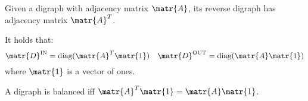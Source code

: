 \begin{description}
        \begin{remark}
            Given a digraph with adjacency matrix $\matr{A}$, its reverse digraph has adjacency matrix $\matr{A}^T$.
        \end{remark}

        \begin{remark}
            It holds that:
            \[ 
                \matr{D}^\text{IN} = \text{diag}(\matr{A}^T \matr{1}) 
                \quad
                \matr{D}^\text{OUT} = \text{diag}(\matr{A} \matr{1})
            \]
            where $\matr{1}$ is a vector of ones.
        \end{remark}

        \begin{remark}
            A digraph is balanced iff $\matr{A}^T \matr{1} = \matr{A} \matr{1}$.
        \end{remark}
\end{description}